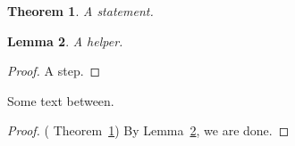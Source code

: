 \documentclass{article}
\newtheorem{theorem}{Theorem}
\newtheorem{lemma}[theorem]{Lemma}
\begin{document}
\begin{theorem}\label{main}
A statement.
\end{theorem}
\begin{lemma}\label{aux}
A helper.
\end{lemma}
\begin{proof}
A step.
\end{proof}
Some text between.

\begin{proof}( Theorem~\ref{main})
By Lemma~\ref{aux}, we are done.
\end{proof}
\end{document}
